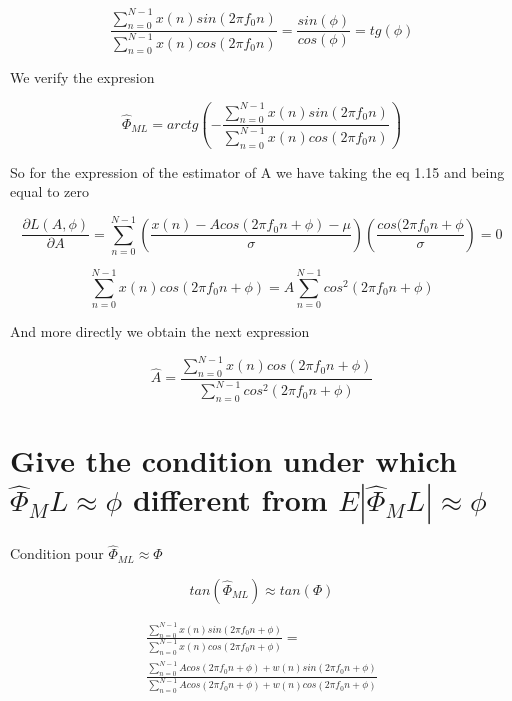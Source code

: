 \documentclass{report}
\begin{document}
\begin{equation}\label{key}
\frac{\sum_{n=0}^{N-1}x(n)sin(2\pi f_0 n)}{\sum_{n=0}^{N-1}x(n)cos(2\pi f_0 n )} = \frac{sin(\phi )}{cos(\phi)} = tg(\phi)
\end{equation}

We verify the expresion

\begin{equation}\label{key}
\hat{\Phi}_{ML} = arctg(-\frac{\sum_{n=0}^{N-1}x(n)sin(2\pi f_0 n)}{\sum_{n=0}^{N-1}x(n)cos(2\pi f_0 n )})
\end{equation}


So for the expression of the estimator of A we have taking the
eq 1.15 and being equal to zero

\begin{equation}\label{key}
\frac{\partial L(A,\phi)}{\partial A} = \sum_{n=0}^{N-1} (\frac{x(n) - A cos (2\pi f_0 n + \phi)-\mu}{\sigma})(\frac{cos(2\pi f_0 n +\phi}{\sigma}) = 0
\end{equation}

\begin{equation}\label{key}
\sum_{n=0}^{N-1}x(n)cos(2\pi f_0 n + \phi) = A\sum_{n=0}^{N-1}cos^2(2\pi f_0 n + \phi)
\end{equation}

And more directly we obtain the next expression

\begin{equation}\label{key}
\hat{A} = \frac{\sum_{n=0}^{N-1}x(n)cos(2\pi f_0 n + \phi)}{\sum_{n=0}^{N-1}cos^2(2\pi f_0 n + \phi)}
\end{equation}











\section{Give the condition under which $ \hat{\Phi}_ML \approx \phi $ 
different from $ E|\hat{\Phi}_ML| \approx \phi $ }
\label{sec:condition}


Condition pour $\hat{\Phi}_{ML} \approx \Phi$

\begin{equation}\label{key}
tan(\hat{\Phi}_{ML} ) \approx tan(\Phi)
\end{equation}



\begin{gather*}
\frac{\sum_{n=0}^{N-1}x(n)sin(2\pi f_0n+\phi)}{\sum_{n=0}^{N-1}x(n)cos(2\pi f_0n+\phi)} = \\
\frac{\sum_{n=0}^{N-1}Acos(2\pi f_0n+\phi)+w(n)sin(2\pi f_0n+\phi)}{\sum_{n=0}^{N-1}Acos(2\pi f_0n+\phi)+w(n)cos(2\pi f_0n+\phi)}
\end{gather*}
\end{document}
